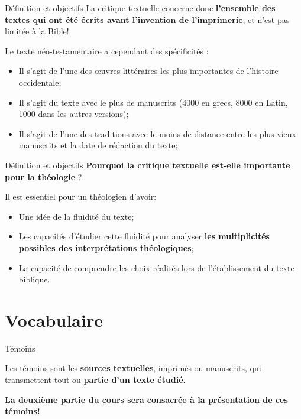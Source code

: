 \documentclass[11pt]{beamer}
\begin{document}
\begin{frame}{Définition et objectifs}
La critique textuelle concerne donc \textbf{l'ensemble des textes qui ont été écrits avant l'invention de l'imprimerie}, et n'est pas limitée à la Bible!\\
\pause
\begin{block}{}
    Le texte néo-testamentaire a cependant des spécificités :
    \begin{itemize}
\item Il s'agit de l'une des \oe{}uvres littéraires les plus importantes de l'histoire occidentale;
\pause
\item Il s'agit du texte avec le plus de manuscrits (4000 en grecs, 8000 en Latin, 1000 dans les autres versions);
\pause
\item Il s'agit de l'une des traditions avec le moins de distance entre les plus vieux manuscrits et la date de rédaction du texte;
    \end{itemize}
\end{block}

\end{frame}

\begin{frame}{Définition et objectifs}
\textbf{Pourquoi la critique textuelle est-elle importante pour la théologie} ?
\pause

\begin{alertblock}{}
Il est essentiel pour un théologien d'avoir:
\begin{itemize}
\item Une idée de la fluidité du texte;
\item Les capacités d'étudier cette fluidité pour analyser \textbf{les multiplicités possibles des interprétations théologiques};
\item La capacité de comprendre les choix réalisés lors de l'établissement du texte biblique.
\end{itemize}
\end{alertblock}

\end{frame}

\section{Vocabulaire}

\begin{frame}{Témoins}
\pause
    \begin{alertblock}{}
    Les témoins sont les \textbf{sources textuelles}, imprimés ou manuscrits, qui transmettent tout ou \textbf{partie d’un texte étudié}.
    \end{alertblock}
    \vfill
    \textbf{La deuxième partie du cours sera consacrée à la présentation de ces témoins!}
\end{frame}
\end{document}
